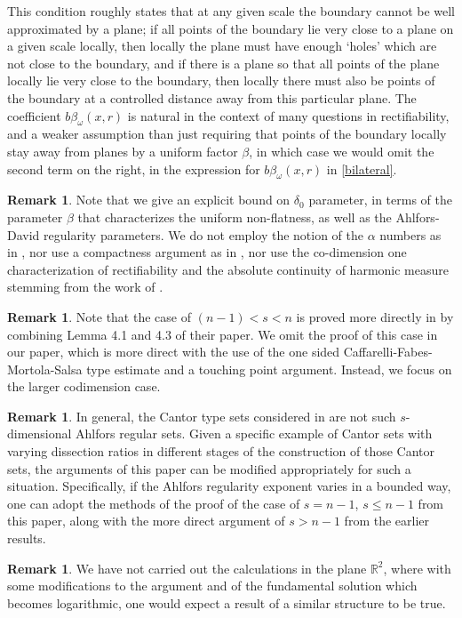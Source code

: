 \documentclass{article}
\newcounter{rmk}
\theoremstyle{plain}
\theoremstyle{plain}
\newcommand{\R}{\mathbb{R}}
\theoremstyle{definition}
\newtheorem{remark}[rmk]{Remark}
\theoremstyle{plain}
\begin{document}
This condition roughly states that at any given scale the boundary cannot be well approximated by a plane; if all points of the boundary lie very close to a plane on a given scale locally, then locally the plane must have enough `holes' which are not close to the boundary, and if there is a plane so that all points of the plane locally lie very close to the boundary, then locally there must also be points of the boundary at a controlled distance away from this particular plane. The coefficient $b\beta_{\omega}(x,r)$ is natural in the context of many questions in rectifiability, and a weaker assumption than just requiring that points of the boundary locally stay away from planes by a uniform factor $\beta$, in which case we would omit the second term on the right, in the expression for $b\beta_{\omega}(x,r)$ in \cref{bilateral}.



\begin{remark}
    Note that we give an explicit bound on $\delta_0$ parameter, in terms of the parameter $\beta$ that characterizes the uniform non-flatness, as well as the Ahlfors-David regularity parameters. We do not employ the notion of the $\alpha$ numbers as in \cite{Tol15}, nor use a compactness argument as in \cite{Az20}, nor use the co-dimension one characterization of rectifiability and the absolute continuity of harmonic measure stemming from the work of \cite{AHMMMTV16}.
\end{remark}

\begin{remark}Note that the case of $(n-1)< s< n$ is proved more directly in \cite{Az20} by combining Lemma 4.1 and 4.3 of their paper. We omit the proof of this case in our paper, which is more direct with the use of the one sided Caffarelli-Fabes-Mortola-Salsa type estimate and a touching point argument. Instead, we focus on the larger codimension case.
\end{remark}



\begin{remark}
    In general, the Cantor type sets considered in \cite{Bat96} are not such $s$- dimensional Ahlfors regular sets. Given a specific example of Cantor sets with varying dissection ratios in different stages of the construction of those Cantor sets, the arguments of this paper can be modified appropriately for such a situation. Specifically, if the Ahlfors regularity exponent varies in a bounded way, one can adopt the methods of the proof of the case of $s=n-1$, $s\leq n-1$ from this paper, along with the more direct argument of $s>n-1$ from the earlier results.
\end{remark}
\begin{remark}
    We have not carried out the calculations in the plane $\R^2$, where with some modifications to the argument and of the fundamental solution which becomes logarithmic, one would expect a result of a similar structure to be true.
\end{remark}
\end{document}
